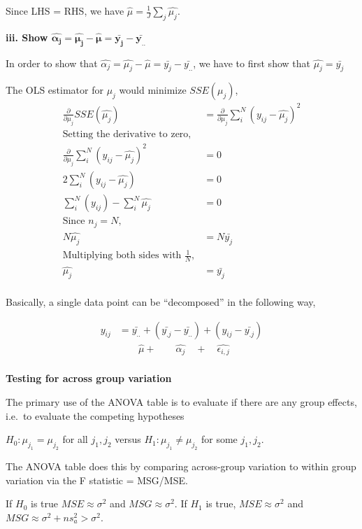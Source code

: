 \documentclass[12pt,]{article}
\begin{document}
Since LHS = RHS, we have \(\hat{\mu} = \frac{1}{J}\sum_j \hat{\mu_j}\).

\textbf{iii. Show $\pmb{\hat{\alpha_j}=\hat{\mu_j} - \hat{\mu}= \bar{y_j} - \bar{y_{..}}}$}

In order to show that
\(\hat{\alpha_j} = \hat{\mu_j} - \hat{\mu}= \bar{y_j} - \bar{y_{..}}\),
we have to first show that \(\hat{\mu_j} = \bar{y_j}\)

The OLS estimator for \(\mu_j\) would minimize \(SSE(\mu_j)\), \[
\begin{aligned}
\frac{\partial}{\partial\mu_j}SSE(\hat{\mu_j}) &= \frac{\partial}{\partial\mu_j}\sum_i^N(y_{ij} - \hat{\mu_j})^2\\
\text{Setting the derivative to zero, }\\
\frac{\partial}{\partial\mu_j}\sum_i^N(y_{ij} - \hat{\mu_j})^2 &= 0\\
2\sum_i^N(y_{ij} - \hat{\mu_j}) &= 0\\
\sum_i^N(y_{ij}) - \sum_i^N\hat{\mu_j} &= 0\\
\text{Since } n_j = N, \\
N\hat{\mu_j} &= N\bar{y_j}\\
\text{Multiplying both sides with }\frac{1}{N}, \\
\hat{\mu_j} &= \bar{y_j}\\
\end{aligned}
\]

Basically, a single data point can be ``decomposed'' in the following
way,

\[
\begin{aligned}
y_{ij} &= \bar{y_{..}} + (\bar{y_{.j}} - \bar{y_{..}}) + (y_{ij} - \bar{y_{.j}})\\
& \qquad \hat{\mu} + \qquad \hat{\alpha_j} \quad + \quad\hat{\epsilon_{i,j}}\\
\end{aligned}
\]

\textbf{Testing for across group variation}

The primary use of the ANOVA table is to evaluate if there are any group
effects, i.e.~to evaluate the competing hypotheses

\(H_0: \mu_{j_1} = \mu_{j_2}\) for all \(j_1, j_2\) versus
\(H_1: \mu_{j_1} \neq \mu_{j_2}\) for some \(j_1, j_2\).

The ANOVA table does this by comparing across-group variation to within
group variation via the F statistic = MSG/MSE.

If \(H_0\) is true \(MSE \approx \sigma^2\) and
\(MSG \approx \sigma^2\). If \(H_1\) is true, \(MSE \approx \sigma^2\)
and \(MSG \approx \sigma^2 + ns^2_a > \sigma^2\).
\end{document}
